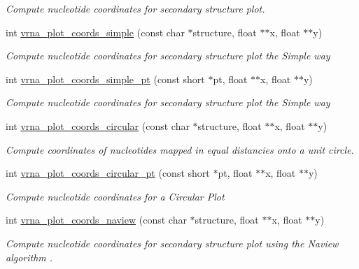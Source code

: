 \begin{DoxyCompactItemize}
\begin{DoxyCompactList}\small\item\em Compute nucleotide coordinates for secondary structure plot. \end{DoxyCompactList}\item 
int \mbox{\hyperlink{group__plot__layout__utils_gaea0dada4d0113d16d4890bc0937292e6}{vrna\+\_\+plot\+\_\+coords\+\_\+simple}} (const char $\ast$structure, float $\ast$$\ast$x, float $\ast$$\ast$y)
\begin{DoxyCompactList}\small\item\em Compute nucleotide coordinates for secondary structure plot the {\itshape Simple way} \end{DoxyCompactList}\item 
int \mbox{\hyperlink{group__plot__layout__utils_ga76788091848e73cfb24b31536e22b7dd}{vrna\+\_\+plot\+\_\+coords\+\_\+simple\+\_\+pt}} (const short $\ast$pt, float $\ast$$\ast$x, float $\ast$$\ast$y)
\begin{DoxyCompactList}\small\item\em Compute nucleotide coordinates for secondary structure plot the {\itshape Simple way} \end{DoxyCompactList}\item 
int \mbox{\hyperlink{group__plot__layout__utils_ga47ff1fd92e9658361a758fdb03122911}{vrna\+\_\+plot\+\_\+coords\+\_\+circular}} (const char $\ast$structure, float $\ast$$\ast$x, float $\ast$$\ast$y)
\begin{DoxyCompactList}\small\item\em Compute coordinates of nucleotides mapped in equal distancies onto a unit circle. \end{DoxyCompactList}\item 
int \mbox{\hyperlink{group__plot__layout__utils_gaeec80faa235f3ca489bc5e50adc41460}{vrna\+\_\+plot\+\_\+coords\+\_\+circular\+\_\+pt}} (const short $\ast$pt, float $\ast$$\ast$x, float $\ast$$\ast$y)
\begin{DoxyCompactList}\small\item\em Compute nucleotide coordinates for a {\itshape Circular Plot} \end{DoxyCompactList}\item 
int \mbox{\hyperlink{group__plot__layout__utils_gac0335e398d01202c77c1d7b28811b761}{vrna\+\_\+plot\+\_\+coords\+\_\+naview}} (const char $\ast$structure, float $\ast$$\ast$x, float $\ast$$\ast$y)
\begin{DoxyCompactList}\small\item\em Compute nucleotide coordinates for secondary structure plot using the {\itshape Naview} algorithm \cite{bruccoleri:1988}. \end{DoxyCompactList}\item 

\end{DoxyCompactItemize}
